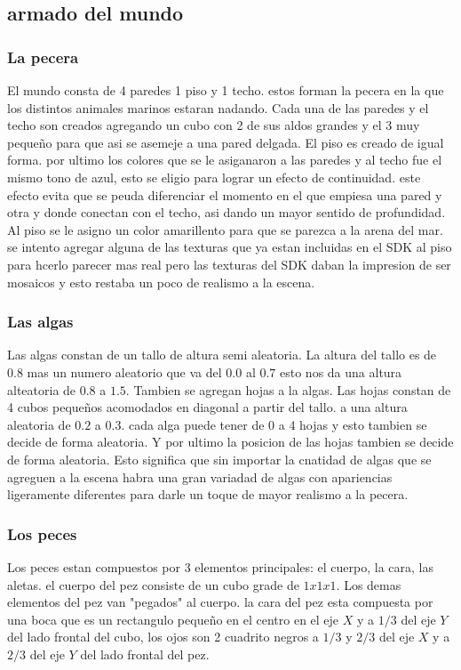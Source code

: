 \documentclass[10pt, a4paper, twocolumn]{article}
\begin{document}
\subsection{armado del mundo}
\subsubsection{La pecera}

El mundo consta de 4 paredes 1 piso y 1 techo. estos forman la pecera en la que los distintos animales marinos estaran nadando.
Cada una de las paredes y el techo son creados agregando un cubo con 2 de sus aldos grandes y el 3 muy pequeño para que asi se asemeje a una pared delgada. El piso es creado de igual forma. por ultimo los colores que se le asiganaron a las paredes y al techo fue el mismo tono de azul, esto se eligio para lograr un efecto de continuidad. este efecto evita que se peuda diferenciar el momento en el que empiesa una pared y otra y donde conectan con el techo, asi dando un mayor sentido de profundidad.
Al piso se le asigno un color amarillento para que se parezca a la arena del mar. 
se intento agregar alguna de las texturas que ya estan incluidas en el SDK al piso para hcerlo parecer mas real pero las texturas del SDK daban la impresion de ser mosaicos y esto restaba un poco de realismo a la escena.  

\subsubsection{Las algas}
Las algas constan de un tallo de altura semi aleatoria. La altura del tallo es de 0.8 mas un numero aleatorio que va del $0.0$ al $0.7$ esto nos da una altura alteatoria de $0.8$ a $1.5$. Tambien se agregan hojas a la algas. Las hojas constan de 4 cubos pequeños acomodados en diagonal a partir del tallo. a una altura aleatoria de $0.2$ a $0.3$. cada alga puede tener de 0 a 4 hojas y esto tambien se decide de forma aleatoria. Y por ultimo la posicion de las hojas tambien se decide de forma aleatoria. Esto significa que sin importar la cnatidad de algas que se agreguen a la escena habra una gran variadad de algas con apariencias ligeramente diferentes para darle un toque de mayor realismo a la pecera.

\subsubsection{Los peces}
Los peces estan compuestos por 3 elementos principales: el cuerpo, la cara, las aletas. el cuerpo del pez consiste de un cubo grade de $1x1x1$. Los demas elementos del pez van "pegados" al cuerpo. la cara del pez esta compuesta por una boca que es un rectangulo pequeño en el centro en el eje $X$ y a $1/3$ del eje $Y$ del lado frontal del cubo, los ojos son 2 cuadrito negros a $1/3$ y $2/3$ del eje $X$ y a $2/3$ del eje $Y$ del lado frontal del pez. 
\end{document}
